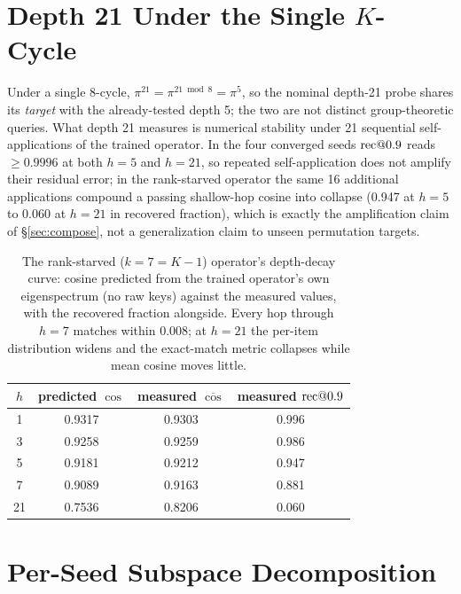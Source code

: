 \appendix

\section{Depth 21 Under the Single $K$-Cycle}
\label{app:period}

Under a single 8-cycle, $\pi^{21} = \pi^{21 \bmod 8} = \pi^{5}$, so the
nominal depth-21 probe shares its \emph{target} with the already-tested
depth 5; the two are not distinct group-theoretic queries. What depth 21
measures is numerical stability under 21 sequential self-applications of
the trained operator. In the four converged seeds $\mathrm{rec}@0.9$ reads
$\geq 0.9996$ at both $h{=}5$ and $h{=}21$, so repeated self-application
does not amplify their residual error;
in the rank-starved operator the same 16 additional applications
compound a passing shallow-hop cosine into collapse (0.947 at $h{=}5$
to 0.060 at $h{=}21$ in recovered fraction),
which is exactly the amplification claim of \S\ref{sec:compose}, not a
generalization claim to unseen permutation targets.

\begin{table}[!htb]
\centering
\small
\begin{tabular}{cccc}
\toprule
$h$ & predicted $\cos$ & measured $\overline{\cos}$ & measured $\mathrm{rec}@0.9$ \\
\midrule
1  & 0.9317 & 0.9303 & 0.996 \\
3  & 0.9258 & 0.9259 & 0.986 \\
5  & 0.9181 & 0.9212 & 0.947 \\
7  & 0.9089 & 0.9163 & 0.881 \\
21 & 0.7536 & 0.8206 & 0.060 \\
\bottomrule
\end{tabular}
\caption{The rank-starved ($k = 7 = K - 1$) operator's depth-decay
curve: cosine predicted from the trained operator's own eigenspectrum
(no raw keys) against the measured values, with the recovered fraction
alongside. Every hop through $h = 7$ matches within 0.008; at $h = 21$
the per-item distribution widens and the exact-match metric collapses
while mean cosine moves little.}
\label{tab:depthcurve}
\end{table}

\section{Per-Seed Subspace Decomposition}
\label{app:subspace}

